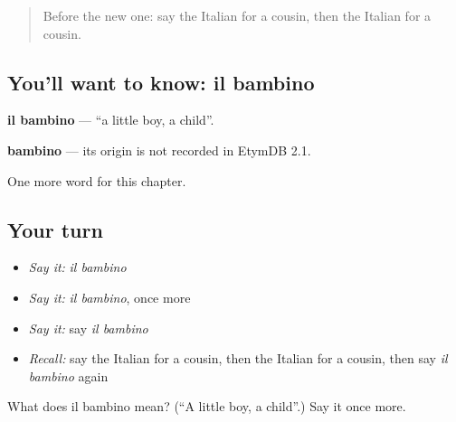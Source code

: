 \begin{quote}
Before the new one: say the Italian for a cousin, then the Italian for a cousin.
\end{quote}

\subsection*{You'll want to know: il bambino}
\textbf{il bambino} — \textquotedblleft{}a little boy, a child\textquotedblright{}.

\begin{cousinweb}
\textbf{bambino} — its origin is not recorded in EtymDB 2.1.
\end{cousinweb}

\begin{grammarlens}[title={What you've built}]
One more word for this chapter.
\end{grammarlens}

\subsection*{Your turn}
\begin{itemize}
\raggedright
  \item \emph{Say it:} \emph{il bambino}
  \item \emph{Say it:} \emph{il bambino}, once more
  \item \emph{Say it:} say \emph{il bambino}
  \item \emph{Recall:} say the Italian for a cousin, then the Italian for a cousin, then say \emph{il bambino} again
\end{itemize}

\begin{tcolorbox}[breakable,colback=teal!4,colframe=teal!35!black,title={Before you move on}]
What does il bambino mean? (\textquotedblleft{}A little boy, a child\textquotedblright{}.) Say it once more.
\end{tcolorbox}

